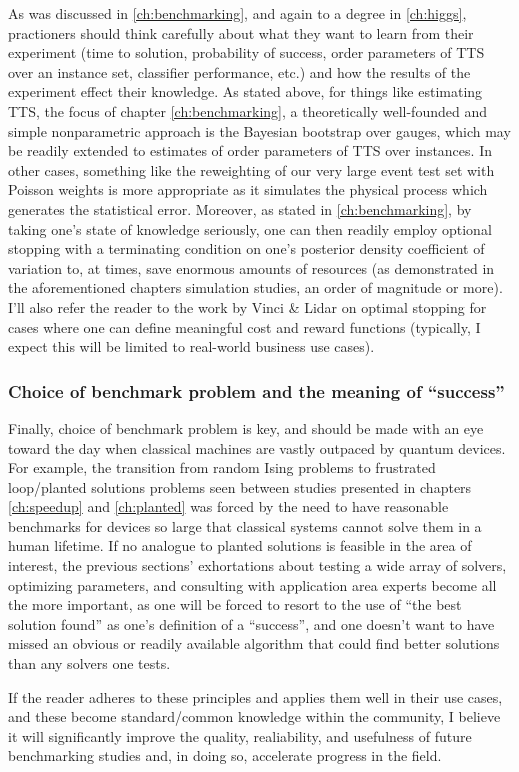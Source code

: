 	As was discussed in \ref{ch:benchmarking}, and again to a degree in \ref{ch:higgs}, practioners should think carefully about what they want to learn from their experiment (time to solution, probability of success, order parameters of TTS over an instance set, classifier performance, etc.) and how the results of the experiment effect their knowledge. As stated above, for things like estimating TTS, the focus of chapter \ref{ch:benchmarking}, a theoretically well-founded and simple nonparametric approach is the Bayesian bootstrap over gauges, which may be readily extended to estimates of order parameters of TTS over instances. In other cases, something like the reweighting of our very large event test set with Poisson weights is more appropriate as it simulates the physical process which generates the statistical error. Moreover, as stated in \ref{ch:benchmarking}, by taking one's state of knowledge seriously, one can then readily employ optional stopping with a terminating condition on one's posterior density coefficient of variation to, at times, save enormous amounts of resources (as demonstrated in the aforementioned chapters simulation studies, an order of magnitude or more). I'll also refer the reader to the work by Vinci \& Lidar \cite{Vinci:2016tg} on optimal stopping for cases where one can define meaningful cost and reward functions (typically, I expect this will be limited to real-world business use cases).

\subsubsection{Choice of benchmark problem and the meaning of ``success''}

	Finally, choice of benchmark problem is key, and should be made with an eye toward the day when classical machines are vastly outpaced by quantum devices. For example, the transition from random Ising problems to frustrated loop/planted solutions problems seen between studies presented in chapters \ref{ch:speedup} and \ref{ch:planted} was forced by the need to have reasonable benchmarks for devices so large that classical systems cannot solve them in a human lifetime. If no analogue to planted solutions is feasible in the area of interest, the previous sections' exhortations about testing a wide array of solvers, optimizing parameters, and consulting with application area experts become all the more important, as one will be forced to resort to the use of ``the best solution found'' as one's definition of a ``success'', and one doesn't want to have missed an obvious or readily available algorithm that could find better solutions than any solvers one tests.
\newline\newline\newline\newline

If the reader adheres to these principles and applies them well in their use cases, and these become standard/common knowledge within the community, I believe it will significantly improve the quality, realiability, and usefulness of future benchmarking studies and, in doing so, accelerate progress in the field.
